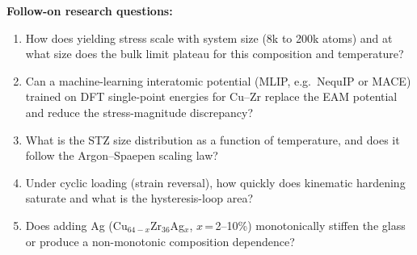 \noindent\textbf{Follow-on research questions:}
\begin{enumerate}[leftmargin=1.6em,itemsep=0.2em,topsep=0.2em,label=Q\arabic*.]
\item How does yielding stress scale with system size (8k to 200k atoms) and at what size does the bulk limit plateau for this composition and temperature?
\item Can a machine-learning interatomic potential (MLIP, e.g.\ NequIP or MACE) trained on DFT single-point energies for Cu--Zr replace the EAM potential and reduce the stress-magnitude discrepancy?
\item What is the STZ size distribution as a function of temperature, and does it follow the Argon--Spaepen scaling law?
\item Under cyclic loading (strain reversal), how quickly does kinematic hardening saturate and what is the hysteresis-loop area?
\item Does adding Ag (Cu$_{64-x}$Zr$_{36}$Ag$_x$, $x$\,=\,2--10\%) monotonically stiffen the glass or produce a non-monotonic composition dependence?
\end{enumerate}

